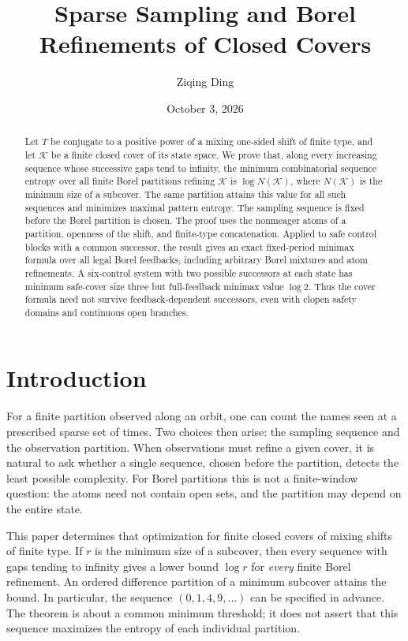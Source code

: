 \documentclass[11pt,reqno]{amsart}
\title[Sparse sampling and Borel refinements]{Sparse Sampling and Borel Refinements of Closed Covers}
\author{Ziqing Ding}
\date{October 3, 2026}
\numberwithin{equation}{section}
\theoremstyle{definition}
\theoremstyle{remark}
\newcommand{\K}{\mathcal K}
\begin{document}
\begin{abstract}
Let $T$ be conjugate to a positive power of a mixing one-sided shift of
finite type, and let $\K$ be a finite closed cover of its state space.
We prove that, along every increasing sequence whose successive gaps tend
to infinity, the minimum combinatorial sequence entropy over all finite
Borel partitions refining $\K$ is $\log N(\K)$, where $N(\K)$ is the
minimum size of a subcover. The same partition attains this value for all
such sequences and minimizes maximal pattern entropy. The sampling sequence
is fixed before the Borel partition is chosen. The proof uses the
nonmeager atoms of a partition, openness of the shift, and finite-type
concatenation. Applied to safe control blocks with a common successor, the
result gives an exact fixed-period minimax formula over all legal Borel
feedbacks, including arbitrary Borel mixtures and atom refinements.
A six-control system with two possible successors at each state has
minimum safe-cover size three but full-feedback minimax value $\log 2$.
Thus the cover formula need not survive feedback-dependent successors,
even with clopen safety domains and continuous open branches.
\end{abstract}
\maketitle

\section{Introduction}

For a finite partition observed along an orbit, one can count the names
seen at a prescribed sparse set of times. Two choices then arise: the
sampling sequence and the observation partition. When observations must
refine a given cover, it is natural to ask whether a single sequence,
chosen before the partition, detects the least possible complexity.
For Borel partitions this is not a finite-window question: the atoms need
not contain open sets, and the partition may depend on the entire state.

This paper determines that optimization for finite closed covers of
mixing shifts of finite type. If $r$ is the minimum size of a subcover,
then every sequence with gaps tending to infinity gives a lower bound
$\log r$ for \emph{every} finite Borel refinement. An ordered difference
partition of a minimum subcover attains the bound. In particular, the
sequence $(0,1,4,9,\ldots)$ can be specified in advance. The theorem is
about a common minimum threshold; it does not assert that this sequence
maximizes the entropy of each individual partition.
\end{document}
